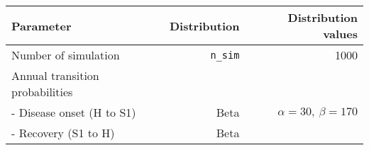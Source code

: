 \documentclass[]{article}
\begin{document}
\begin{longtable}[]{@{}lrr@{}}
\toprule
\begin{minipage}[b]{0.32\columnwidth}\raggedright\strut
\textbf{Parameter}\strut
\end{minipage} & \begin{minipage}[b]{0.17\columnwidth}\raggedleft\strut
\textbf{Distribution}\strut
\end{minipage} & \begin{minipage}[b]{0.42\columnwidth}\raggedleft\strut
\textbf{Distribution values}\strut
\end{minipage}\tabularnewline
\midrule
\endhead
\begin{minipage}[t]{0.32\columnwidth}\raggedright\strut
Number of simulation\strut
\end{minipage} & \begin{minipage}[t]{0.17\columnwidth}\raggedleft\strut
\texttt{n\_sim}\strut
\end{minipage} & \begin{minipage}[t]{0.42\columnwidth}\raggedleft\strut
1000\strut
\end{minipage}\tabularnewline
\begin{minipage}[t]{0.32\columnwidth}\raggedright\strut
Annual transition probabilities\strut
\end{minipage} & \begin{minipage}[t]{0.17\columnwidth}\raggedleft\strut
\strut
\end{minipage} & \begin{minipage}[t]{0.42\columnwidth}\raggedleft\strut
\strut
\end{minipage}\tabularnewline
\begin{minipage}[t]{0.32\columnwidth}\raggedright\strut
- Disease onset (H to S1)\strut
\end{minipage} & \begin{minipage}[t]{0.17\columnwidth}\raggedleft\strut
Beta\strut
\end{minipage} & \begin{minipage}[t]{0.42\columnwidth}\raggedleft\strut
\(\alpha=30, \ \beta=170\)\strut
\end{minipage}\tabularnewline
\begin{minipage}[t]{0.32\columnwidth}\raggedright\strut
- Recovery (S1 to H)\strut
\end{minipage} & \begin{minipage}[t]{0.17\columnwidth}\raggedleft\strut
Beta\strut
\end{minipage} & \begin{minipage}[t]{0.42\columnwidth}\raggedleft\strut

\end{minipage}
\end{longtable}
\end{document}
